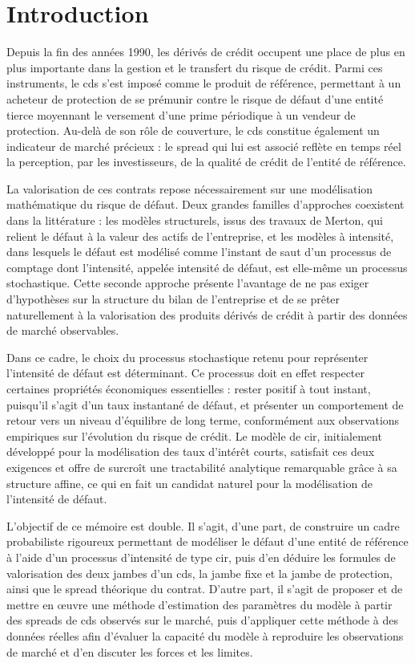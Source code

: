 
\chapter*{Introduction}

Depuis la fin des années 1990, les dérivés de crédit occupent une place de
plus en plus importante dans la gestion et le transfert du risque de crédit.
Parmi ces instruments, le \gls{cds} s'est imposé comme
le produit de référence, permettant à un acheteur de protection de se
prémunir contre le risque de défaut d'une entité tierce moyennant le
versement d'une prime périodique à un vendeur de protection. Au-delà de
son rôle de couverture, le \gls{cds} constitue également un indicateur de marché
précieux : le spread qui lui est associé reflète en temps réel la
perception, par les investisseurs, de la qualité de crédit de l'entité de
référence.

La valorisation de ces contrats repose nécessairement sur une modélisation
mathématique du risque de défaut. Deux grandes familles d'approches
coexistent dans la littérature : les modèles structurels, issus des travaux
de Merton, qui relient le défaut à la valeur des actifs de l'entreprise, et
les modèles à intensité, dans lesquels le défaut est modélisé comme l'instant de saut d'un processus de comptage dont
l'intensité, appelée intensité de défaut, est elle-même un processus
stochastique. Cette seconde approche présente l'avantage de ne pas exiger
d'hypothèses sur la structure du bilan de l'entreprise et de se prêter
naturellement à la valorisation des produits dérivés de crédit à partir
des données de marché observables.

Dans ce cadre, le choix du processus stochastique retenu pour représenter
l'intensité de défaut est déterminant. Ce processus doit en effet respecter
certaines propriétés économiques essentielles : rester positif à tout
instant, puisqu'il s'agit d'un taux instantané de défaut, et présenter un
comportement de retour vers un niveau d'équilibre de long terme, conformément
aux observations empiriques sur l'évolution du risque de crédit. Le modèle
de \gls{cir}, initialement développé pour la modélisation
des taux d'intérêt courts, satisfait ces deux exigences et offre de surcroît
une tractabilité analytique remarquable grâce à sa structure affine, ce qui
en fait un candidat naturel pour la modélisation de l'intensité de défaut.

L'objectif de ce mémoire est double. Il s'agit, d'une part, de construire un
cadre probabiliste rigoureux permettant de modéliser le défaut d'une entité
de référence à l'aide d'un processus d'intensité de type \gls{cir}, puis d'en
déduire les formules de valorisation des deux jambes d'un \gls{cds}, la jambe fixe
et la jambe de protection, ainsi que le spread théorique du contrat.
D'autre part, il s'agit de proposer et de mettre en \oe uvre une méthode
d'estimation des paramètres du modèle à partir des spreads de \gls{cds}
observés sur le marché, puis d'appliquer cette méthode à des données
réelles afin d'évaluer la capacité du modèle à reproduire les
observations de marché et d'en discuter les forces et les limites.

